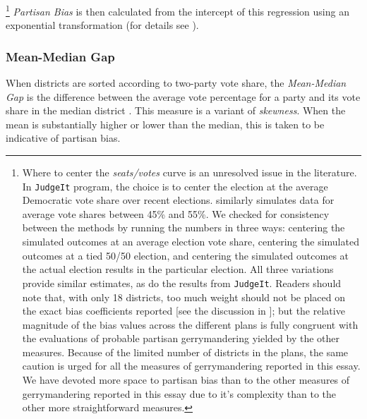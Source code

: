     	\footnote{Where to center the \textit{seats/votes} curve is an unresolved issue in the literature. In \citet{GelmanKing1994_unifiedAJPS} \texttt{JudgeIt} program, the choice is to center the election at the average Democratic vote share over recent elections. \citet{Kastellec_et_al_2008_PS} similarly simulates data for average vote shares between 45\% and 55\%. We checked for consistency between the methods by running the numbers in three ways: centering the simulated outcomes at an average election vote share, centering the simulated outcomes at a tied 50/50 election, and centering the simulated outcomes at the actual election results in the particular election. All three variations provide similar estimates, as do the results from \texttt{JudgeIt}. Readers should note that, with only 18 districts, too much weight should not be placed on the exact bias coefficients reported [see the discussion in \citet{Browning_King_1987_seats_votes}]; but the relative magnitude of the bias values across the different plans is fully congruent with the evaluations of probable partisan gerrymandering yielded by the other measures. Because of the limited number of districts in the plans, the same caution is urged for all the measures of gerrymandering reported in this essay. We have devoted more space to partisan bias than to the other measures of gerrymandering reported in this essay due to it's complexity than to the other more straightforward measures.} 
    \textit{Partisan Bias} is then calculated from the intercept of this regression using an exponential transformation (for details see \citet{Grofman1983}).
\par
            \subsubsection*{Mean-Median Gap}
    When districts are sorted according to two-party vote share, the \textit{Mean-Median Gap} is the difference between the average vote percentage for a party and its vote share in the median district \citep[see][]{Best2018}. This measure is a variant of \textit{skewness}. When the mean is substantially higher or lower than the median, this is taken to be indicative of partisan bias.
\par
